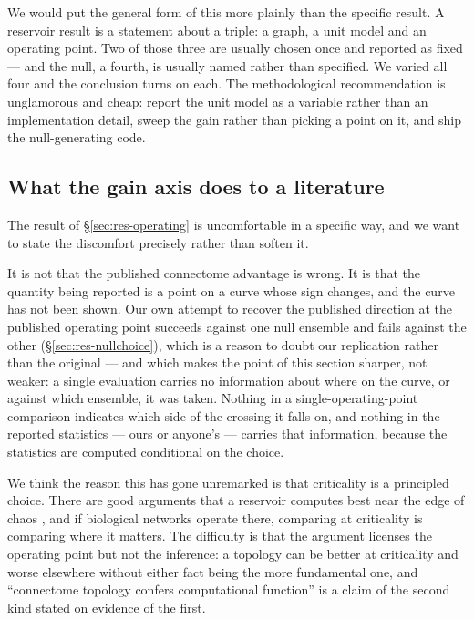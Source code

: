 We would put the general form of this more plainly than the specific result. A reservoir
result is a statement about a triple: a graph, a unit model and an operating point. Two of
those three are usually chosen once and reported as fixed --- and the null, a fourth, is
usually named rather than specified. We varied all four and the conclusion turns on each.
The methodological recommendation is unglamorous and cheap: report the unit model as a
variable rather than an implementation detail, sweep the gain rather than picking a point
on it, and ship the null-generating code.

\subsection{What the gain axis does to a literature}

The result of \S\ref{sec:res-operating} is uncomfortable in a specific way, and we want to
state the discomfort precisely rather than soften it.

It is not that the published connectome advantage is wrong. It is that the quantity being
reported is a point on a curve whose sign changes, and the curve has not been shown. Our
own attempt to recover the published direction at the published operating point succeeds
against one null ensemble and fails against the other (\S\ref{sec:res-nullchoice}), which
is a reason to doubt our replication rather than the original --- and which makes the
point of this section sharper, not weaker: a single evaluation carries no information
about where on the curve, or against which ensemble, it was taken. Nothing in a
single-operating-point comparison indicates which side of the crossing it falls on, and
nothing in the reported statistics --- ours or anyone's --- carries that information,
because the statistics are computed conditional on the choice.

We think the reason this has gone unremarked is that criticality is a principled choice.
There are good arguments that a reservoir computes best near the edge of chaos
\cite{bertschinger2004real,legenstein2007edge,boedecker2012information}, and if biological
networks operate there, comparing at criticality is comparing where it matters. The
difficulty is that the argument licenses the operating point but not the inference: a
topology can be better at criticality and worse elsewhere without either fact being the
more fundamental one, and ``connectome topology confers computational function'' is a
claim of the second kind stated on evidence of the first.

